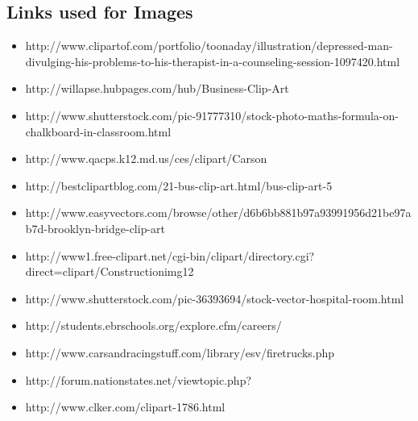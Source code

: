 \documentclass[11pt]{article}%
\begin{document}


\nocite{*}
 
\subsection*{Links used for Images}
\begin{itemize}
\item http://www.clipartof.com/portfolio/toonaday/illustration/depressed-man-divulging-his-problems-to-his-therapist-in-a-counseling-session-1097420.html
\item http://willapse.hubpages.com/hub/Business-Clip-Art
\item http://www.shutterstock.com/pic-91777310/stock-photo-maths-formula-on-chalkboard-in-classroom.html
\item http://www.qacps.k12.md.us/ces/clipart/Carson%
\item http://bestclipartblog.com/21-bus-clip-art.html/bus-clip-art-5
\item http://www.easyvectors.com/browse/other/d6b6bb881b97a93991956d21be97ab7d-brooklyn-bridge-clip-art
\item http://www1.free-clipart.net/cgi-bin/clipart/directory.cgi?direct=clipart/Constructionimg12
\item http://www.shutterstock.com/pic-36393694/stock-vector-hospital-room.html
\item http://students.ebrschools.org/explore.cfm/careers/
\item http://www.carsandracingstuff.com/library/esv/firetrucks.php
\item http://forum.nationstates.net/viewtopic.php?%
\item http://www.clker.com/clipart-1786.html
\end{itemize}
 
\end{document}

